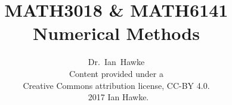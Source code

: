 \documentclass[a4paper,12pt]{report}
\begin{document}

\title{MATH3018 \& MATH6141 \\ Numerical Methods }
\author{Dr.~Ian~Hawke\\ Content provided under a \\Creative Commons attribution license, CC-BY 4.0. \\ \textcopyright\ 2017 Ian Hawke.}
\date{}

\maketitle


\begin{titlepage}
\newpage
\mbox{}
\end{titlepage}

\tableofcontents






%








\appendix

\end{document}
